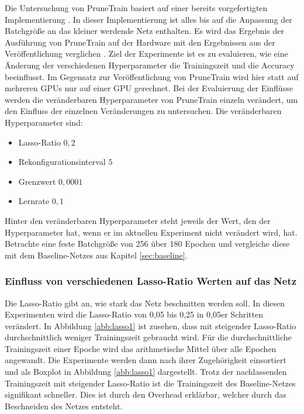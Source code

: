 Die Untersuchung von PruneTrain basiert auf einer bereits vorgefertigten Implementierung \cite{ptImpl}. In dieser Implementierung ist alles bis auf die Anpassung der Batchgröße an das kleiner werdende Netz enthalten. Es wird das Ergebnis der Ausführung von PruneTrain auf der Hardware mit den Ergebnissen aus der Veröffentlichung verglichen \cite{prunetrain}. Ziel der Experimente ist es zu evaluieren, wie eine Änderung der verschiedenen Hyperparameter die Trainingszeit und die Accuracy beeinflusst. Im Gegensatz zur Veröffentlichung von PruneTrain wird hier statt auf mehreren GPUs nur auf einer GPU gerechnet. Bei der Evaluierung der Einflüsse werden die veränderbaren Hyperparameter von PruneTrain einzeln verändert, um den Einfluss der einzelnen Veränderungen zu untersuchen.  
Die veränderbaren Hyperparameter sind:
\begin{itemize}
 \item Lasso-Ratio $0,2$
 \item Rekonfigurationsinterval $5$
 \item Grenzwert $0,0001$
 \item Lernrate $0,1$
\end{itemize}
Hinter den veränderbaren Hyperparameter steht jeweils der Wert, den der Hyperparameter hat, wenn er im aktuellen Experiment nicht verändert wird, hat.
Betrachte eine feste Batchgröße von 256 über 180 Epochen und vergleiche diese mit dem Baseline-Netzes aus Kapitel \ref{sec:baseline}. 


\subsubsection{Einfluss von verschiedenen Lasso-Ratio Werten auf das Netz}
Die Lasso-Ratio gibt an, wie stark das Netz beschnitten werden soll. In diesen Experimenten wird die Lasso-Ratio von 0,05 bis 0,25 in 0,05er Schritten verändert. In Abbildung \ref{abb:lasso1} ist zusehen, dass mit steigender Lasso-Ratio durchschnittlich weniger Trainingszeit gebraucht wird. Für die durchschnittliche Trainingszeit einer Epoche wird das arithmetische Mittel über alle Epochen angewandt. Die Experimente werden dann nach ihrer Zugehörigkeit einsortiert und als Boxplot in Abbildung \ref{abb:lasso1} dargestellt. Trotz der nachlassenden Trainingszeit mit steigender Lasso-Ratio ist die Trainingszeit des Baseline-Netzes signifikant schneller. Dies ist durch den Overhead erklärbar, welcher durch das Beschneiden des Netzes entsteht.


